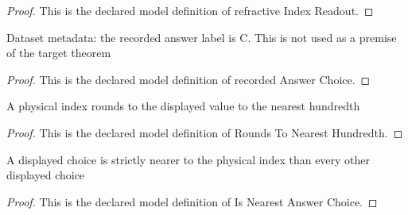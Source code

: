 \begin{proof}
  This is the declared model definition of refractive Index Readout.
\end{proof}
\begin{definition}
  \label{def:physics:phyx-mini-0074:phyxminiproblems-problemphyxmini0074-recordedanswerchoice}
  Dataset metadata: the recorded answer label is C. This is not used as a premise of the target theorem
\end{definition}
\begin{proof}
  This is the declared model definition of recorded Answer Choice.
\end{proof}
\begin{definition}
  \label{def:physics:phyx-mini-0074:phyxminiproblems-problemphyxmini0074-roundstonearesthundredth}
  A physical index rounds to the displayed value to the nearest hundredth
\end{definition}
\begin{proof}
  This is the declared model definition of Rounds To Nearest Hundredth.
\end{proof}
\begin{definition}
  \label{def:physics:phyx-mini-0074:phyxminiproblems-problemphyxmini0074-isnearestanswerchoice}
  A displayed choice is strictly nearer to the physical index than every other displayed choice
\end{definition}
\begin{proof}
  This is the declared model definition of Is Nearest Answer Choice.
\end{proof}

